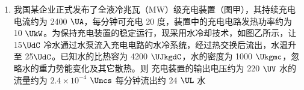\documentclass[\gkver]{gaokaozhenti}
\begin{document}
\begin{enumerate}
{重锤与桩发生撞击过程，根据动量守恒可得 $m_{\text{锤}}v=(m_{\text{锤}}+m_{\text{桩}})v_{\text{共}}$

解得撞击后瞬间的共同速度为 $v_{\text{共}}=1.5$ $\Ums$

在 $t_{2}\sim t_{3}$ 时间内，以向上为正方向，以锤为对象，根据动量定理可得
\[ F_{\text{桩}}(t_{3}-t_{2})-m_{\text{锤}}g(t_{3}-t_{2})=0-(-m_{\text{锤}}v_{\text{共}}) \]
代入数据解得桩对锤的平均作用力大小为 $F_{\text{桩}}=1.75\times10^{4}$ $\UN$

根据牛顿第三定律可知，锤对桩的平均作用力大小为 $1.75\times10^{4}$ $\UN$；

以重锤和桩为整体，根据动量定理可得
\[ F_{\text{土}}(t_{3}-t_{2})-(m_{\text{锤}}+m_{\text{桩}})g(t_{3}-t_{2})=0-[-(m_{\text{锤}}+m_{\text{桩}})v_{\text{共}}] \]
代入数据解得软土对桩的平均阻力大小为 $F_{\text{土}}=7\times10^{4}$ $\UN$，故 A 错误，B 正确；

C．在 $t_{1}\sim t_{3}$ 时间内，除了软土对桩做负功，碰撞过程也存在机械能损失，因此锤和桩的总机械能损失等于软土阻力做功的绝对值加上碰撞过程的机械能损失，故 C 错误；

D．在 $t_{1}\sim t_{3}$ 时间内，由于锤的初、末速度均为 0，锤的动量变化量为 0，根据动量定理可知，锤的重力冲量值大小等于桩对锤作用力的冲量值大小，故 D 错误。

故选 B。
}

\item
我国某企业正式发布了全液冷兆瓦（MW）级充电装置（图甲），其持续充电电流约为 2400 $\UA$，每分钟可充电 20 度，装置中的充电电路发热功率约为 10 $\UkW$。为保持充电装置的稳定运行，现采用水冷却技术，如图乙所示，让 15$\UdC$ 冷水通过水泵流入充电电路的水冷系统，经过热交换后流出，水温升至 25$\UdC$。已知水的比热容为 4200 $\UJkgdC$，水的密度为 1000 $\Ukgmc$，忽略水的重力势能变化及其它散热。则
{充电装置的输出电压约为 220 $\UV$}
{水的流量约为 $2.4\times10^{-4}$ $\Umcs$}
{每分钟流出约 24 $\UL$ 水}
\end{enumerate}
\end{document}
